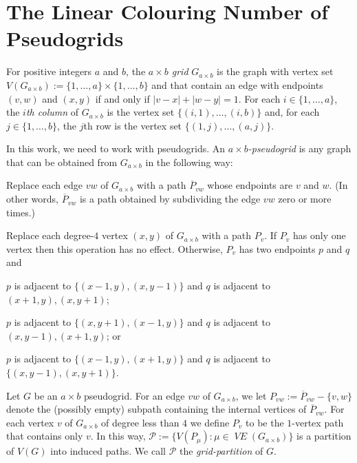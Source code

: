 \documentclass{patmorin}
\newcommand{\defin}[1]{\emph{\color{brown}#1}}
\DeclareMathOperator{\VE}{\mathit{VE}}
\begin{document}
\section{The Linear Colouring Number of Pseudogrids}

For positive integers $a$ and $b$, the \emph{$a\times b$ grid} $G_{a\times b}$ is the graph with vertex set $V(G_{a\times b}):=\{1,\ldots,a\}\times\{1,\ldots,b\}$ and that contain an edge with endpoints $(v,w)$ and $(x,y)$ if and only if $|v-x|+|w-y|=1$.  For each $i\in\{1,\ldots,a\}$, the \emph{$i$th column} of $G_{a\times b}$ is the vertex set $\{(i,1),\ldots,(i,b)\}$ and, for each $j\in\{1,\ldots,b\}$, the $j$th row is the vertex set $\{(1,j),\ldots,(a,j)\}$.

In this work, we need to work with pseudogrids.  An \defin{$a\times b$-pseudogrid} is any graph that can be obtained from $G_{a\times b}$ in the following way:
\begin{compactenum}
  \item Replace each edge $vw$ of $G_{a\times b}$ with a path $\overline{P}_{vw}$ whose endpoints are $v$ and $w$.  (In other words, $\overline{P}_{vw}$ is a path obtained by subdividing the edge $vw$ zero or more times.)
  \item Replace each degree-$4$ vertex $(x,y)$ of $G_{a\times b}$ with a path $P_v$. If $P_v$ has only one vertex then this operation has no effect.  Otherwise, $P_v$ has two endpoints $p$ and $q$ and
  \begin{compactenum}[(Q1)]
    \item \label{q_i} $p$ is adjacent to $\{(x-1,y), (x,y-1)\}$ and $q$ is adjacent to $(x+1,y),(x,y+1)$;
    \item \label{q_ii} $p$ is adjacent to $\{(x,y+1), (x-1,y)\}$ and $q$ is adjacent to $(x,y-1),(x+1,y)$; or
    \item \label{q_iii} $p$ is adjacent to $\{(x-1,y),(x+1,y)\}$ and $q$ is adjacent to $\{(x,y-1),(x,y+1)\}$.
  \end{compactenum}
\end{compactenum}

Let $G$ be an $a\times b$ pseudogrid.  For an edge $vw$ of $G_{a\times b}$, we let $P_{vw}:=\overline{P}_{vw}-\{v,w\}$ denote the (possibly empty) subpath containing the internal vertices of $\overline{P}_{vw}$.  For each vertex $v$ of $G_{a\times b}$ of degree less than $4$ we define $P_{v}$ to be the $1$-vertex path that contains only $v$.  In this way, $\mathcal{P}:=\{V(P_\mu):\mu\in \VE(G_{a\times b})\}$ is a partition of $V(G)$ into induced paths.  We call $\mathcal{P}$ the \defin{grid-partition} of $G$.
\end{document}
